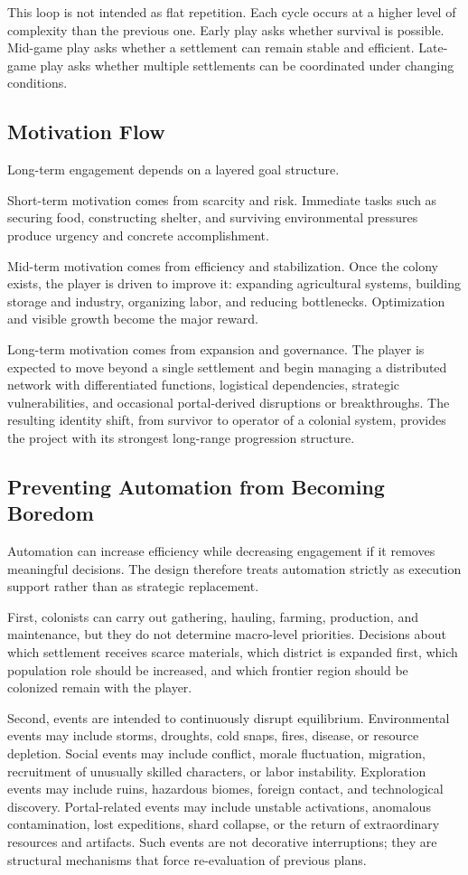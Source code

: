 \documentclass[conference]{IEEEtran}
\begin{document}
This loop is not intended as flat repetition. Each cycle occurs at a higher level of complexity than the previous one. Early play asks whether survival is possible. Mid-game play asks whether a settlement can remain stable and efficient. Late-game play asks whether multiple settlements can be coordinated under changing conditions.

\subsection{Motivation Flow}
Long-term engagement depends on a layered goal structure.

Short-term motivation comes from scarcity and risk. Immediate tasks such as securing food, constructing shelter, and surviving environmental pressures produce urgency and concrete accomplishment.

Mid-term motivation comes from efficiency and stabilization. Once the colony exists, the player is driven to improve it: expanding agricultural systems, building storage and industry, organizing labor, and reducing bottlenecks. Optimization and visible growth become the major reward.

Long-term motivation comes from expansion and governance. The player is expected to move beyond a single settlement and begin managing a distributed network with differentiated functions, logistical dependencies, strategic vulnerabilities, and occasional portal-derived disruptions or breakthroughs. The resulting identity shift, from survivor to operator of a colonial system, provides the project with its strongest long-range progression structure.

\subsection{Preventing Automation from Becoming Boredom}
Automation can increase efficiency while decreasing engagement if it removes meaningful decisions. The design therefore treats automation strictly as execution support rather than as strategic replacement.

First, colonists can carry out gathering, hauling, farming, production, and maintenance, but they do not determine macro-level priorities. Decisions about which settlement receives scarce materials, which district is expanded first, which population role should be increased, and which frontier region should be colonized remain with the player.

Second, events are intended to continuously disrupt equilibrium. Environmental events may include storms, droughts, cold snaps, fires, disease, or resource depletion. Social events may include conflict, morale fluctuation, migration, recruitment of unusually skilled characters, or labor instability. Exploration events may include ruins, hazardous biomes, foreign contact, and technological discovery. Portal-related events may include unstable activations, anomalous contamination, lost expeditions, shard collapse, or the return of extraordinary resources and artifacts. Such events are not decorative interruptions; they are structural mechanisms that force re-evaluation of previous plans.
\end{document}
